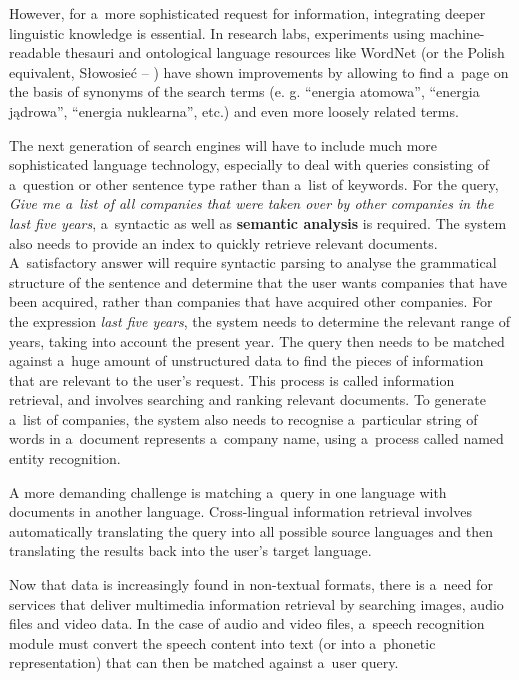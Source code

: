 \begin{multicols}{2}
However, for a~more sophisticated request for information, integrating
deeper linguistic knowledge is essential. In research labs,
experiments using machine-readable thesauri and ontological language
resources like WordNet (or the Polish equivalent, Słowosieć --
\cite{Slowosiec1, Piasecki2009}) have shown improvements by allowing
to find a~page on the basis of synonyms of the search terms (e. g.
“energia atomowa”, “energia jądrowa”, “energia
nuklearna”, etc.) and even more loosely related terms. 


The next generation of search engines will have to include much more
sophisticated language technology, especially to deal with queries
consisting of a~question or other sentence type rather than a~list of
keywords. For the query, \textit{Give me a~list of all companies that
were taken over by other companies in the last five years},
a~syntactic as well as \textbf{semantic analysis} is required. The
system also needs to provide an index to quickly retrieve relevant
documents. A~satisfactory answer will require syntactic parsing to
analyse the grammatical structure of the sentence and determine that
the user wants companies that have been acquired, rather than
companies that have acquired other companies. For the expression
\textit{last five years}, the system needs to determine the relevant
range of years, taking into account the present year. The query then
needs to be matched against a~huge amount of unstructured data to find
the pieces of information that are relevant to the user’s request.
This process is called information retrieval, and involves searching
and ranking relevant documents. To generate a~list of companies, the
system also needs to recognise a~particular string of words in
a~document represents a~company name, using a~process called named
entity recognition. 

A more demanding challenge is matching a~query in one language with
documents in another language. Cross-lingual information retrieval
involves automatically translating the query into all possible source
languages and then translating the results back into the user's target
language. 

Now that data is increasingly found in non-textual formats, there is
a~need for services that deliver multimedia information retrieval by
searching images, audio files and video data. In the case of audio and
video files, a~speech recognition module must convert the speech
content into text (or into a~phonetic representation) that can then be
matched against a~user query. 


\end{multicols}
